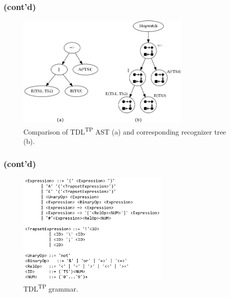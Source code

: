 \documentclass{beamer}
\newcommand{\recallframetitle}{}
\newcommand{\frametitlecont}{%
    \frametitle{\recallframetitle{} (cont'd)}%
}
\newcommand{\TDLTP}{\texorpdfstring{TDL\textsuperscript{TP}}{TDL(TP)}}
\begin{document}
    \begin{frame}
        \frametitlecont{}
        \begin{figure}
            \centering
            \includegraphics[width=0.75\textwidth]{images/presentation/ASTVsRecognizerTree.png}
            \caption{Comparison of \TDLTP{} AST (a) and corresponding recognizer tree (b).}
            \label{fig:tdl_ast_vs_recognizer_tree}
        \end{figure}
    \end{frame}

    \begin{frame}
        \frametitlecont{}
        \begin{figure}
            \centering
            \includegraphics[width=0.65\textwidth]{images/presentation/TdlExpressionSyntax.png}
            \caption{\TDLTP{} grammar.}
            \label{fig:tdl_grammar}
        \end{figure}
    \end{frame}


\end{document}
